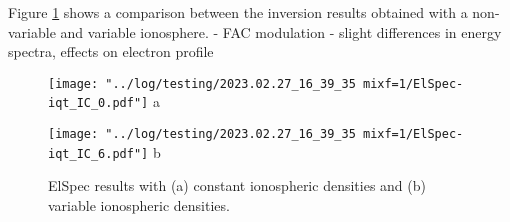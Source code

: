 \documentclass[10pt, a4paper]{article}
\numberwithin{equation}{section}										%
\begin{document}
%
\par\medskip
%
Figure \ref{fig:comp} shows a comparison between the inversion results obtained with a non-variable and variable ionosphere. 
- FAC modulation
- slight differences in energy spectra, effects on electron profile
\begin{figure}
	\centering
    	\begin{minipage}{0.5\textwidth}
			\centering
			\texttt{[image: "../log/testing/2023.02.27\_16\_39\_35 mixf=1/ElSpec-iqt\_IC\_0.pdf"]}
			a
    	\end{minipage}%
    	\begin{minipage}{0.5\textwidth}
        	\centering
			\texttt{[image: "../log/testing/2023.02.27\_16\_39\_35 mixf=1/ElSpec-iqt\_IC\_6.pdf"]}
			b
    	\end{minipage}
    \caption{ElSpec results with (a) constant ionospheric densities and (b) variable ionospheric densities.}
    \label{fig:comp}
\end{figure}
\end{document}
